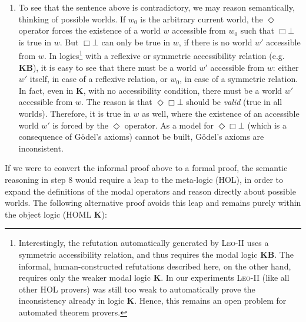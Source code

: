 \documentclass{llncs}
\newcommand{\logic}[1]{\textbf{#1}\xspace}
\newcommand{\KB}{\logic{KB}}
\newcommand{\K}{\logic{K}}
\newcommand{\Dia}{\Diamond} %
\newcommand{\nec}{\Box}
\newcommand{\pos}{\Dia}
\begin{document}
\begin{enumerate}
\item To see that the sentence above is contradictory, we may reason semantically, thinking of possible worlds. If $w_0$ is the arbitrary current world, the $\pos$ operator forces the existence of a world $w$ accessible from $w_0$ such that $\nec \bot$ is true in $w$. But $\nec \bot$ can only be true in $w$, if there is no world $w'$ accessible from $w$. In logics\footnote{
  Interestingly, the refutation automatically generated by
  \textsc{Leo-II} uses a symmetric accessibility relation, and thus
  requires the modal logic \KB. The informal, human-constructed
  refutations described here, on the other hand, requires only the
  weaker modal logic \K. In our experiments \textsc{Leo-II} (like all
  other HOL provers) was still too weak to automatically prove the
  inconsistency already in logic \K. Hence, this remains an open problem for automated
  theorem provers.
} with a reflexive or symmetric accessibility relation (e.g. \KB), it is easy to see that there must be a world $w'$ accessible from $w$: either $w'$ itself, in case of a reflexive relation, or $w_0$, in case of a symmetric relation. In fact, even in \K, with no accessibility condition, there must be a world $w'$ accessible from $w$. The reason is that $\pos \nec \bot$ should be \emph{valid} (true in all worlds). Therefore, it is true in $w$ as well, where the existence of an accessible world $w'$ is forced by the $\pos$ operator. As a model for $\pos \nec \bot$ (which is a consequence of G\"odel's axioms) cannot be built, G\"odel's axioms are inconsistent.
\end{enumerate}

If we were to convert the informal proof above to a formal proof, the semantic reasoning in step 8 would require a leap to the meta-logic (HOL), in order to expand the definitions of the modal operators and reason directly about possible worlds. The following alternative proof avoids this leap and remains purely within the object logic (HOML \K):
\end{document}
